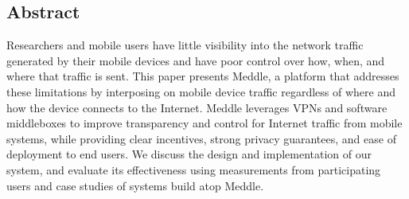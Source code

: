 \subsection*{Abstract}
Researchers and mobile users have little visibility into the network 
traffic generated by their mobile devices and have poor control over 
how, when, and where that traffic is sent. This paper presents Meddle, a platform that 
addresses these limitations by interposing on mobile 
device traffic regardless of where and how the device connects to the Internet.
Meddle leverages 
VPNs and software middleboxes to improve transparency and control 
for Internet traffic from mobile systems, while providing clear incentives, strong privacy guarantees, 
and ease of deployment to end users. We discuss 
the design and implementation of our system, and evaluate its effectiveness using 
measurements from participating users and case studies of systems build atop Meddle. 







